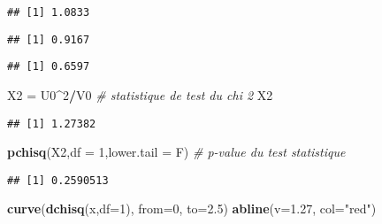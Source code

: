 \documentclass[
]{article}
\newenvironment{Shaded}{\begin{snugshade}}{\end{snugshade}}
\newcommand{\CommentTok}[1]{\textcolor[rgb]{0.56,0.35,0.01}{\textit{#1}}}
\newcommand{\DataTypeTok}[1]{\textcolor[rgb]{0.13,0.29,0.53}{#1}}
\newcommand{\DecValTok}[1]{\textcolor[rgb]{0.00,0.00,0.81}{#1}}
\newcommand{\FloatTok}[1]{\textcolor[rgb]{0.00,0.00,0.81}{#1}}
\newcommand{\KeywordTok}[1]{\textcolor[rgb]{0.13,0.29,0.53}{\textbf{#1}}}
\newcommand{\NormalTok}[1]{#1}
\newcommand{\OperatorTok}[1]{\textcolor[rgb]{0.81,0.36,0.00}{\textbf{#1}}}
\newcommand{\StringTok}[1]{\textcolor[rgb]{0.31,0.60,0.02}{#1}}
\begin{document}
\begin{verbatim}
## [1] 1.0833
\end{verbatim}

\begin{Shaded}
\end{Shaded}

\begin{verbatim}
## [1] 0.9167
\end{verbatim}

\begin{Shaded}
\end{Shaded}

\begin{verbatim}
## [1] 0.6597
\end{verbatim}

\begin{Shaded}
\begin{Highlighting}[]
\NormalTok{X2 =}\StringTok{ }\NormalTok{U0}\OperatorTok{^}\DecValTok{2}\OperatorTok{/}\NormalTok{V0 }\CommentTok{# statistique de test du chi 2}
\NormalTok{X2}
\end{Highlighting}
\end{Shaded}

\begin{verbatim}
## [1] 1.27382
\end{verbatim}

\begin{Shaded}
\begin{Highlighting}[]
\KeywordTok{pchisq}\NormalTok{(X2,}\DataTypeTok{df =} \DecValTok{1}\NormalTok{,}\DataTypeTok{lower.tail =}\NormalTok{ F) }\CommentTok{# p-value du test statistique}
\end{Highlighting}
\end{Shaded}

\begin{verbatim}
## [1] 0.2590513
\end{verbatim}

\begin{Shaded}
\begin{Highlighting}[]
\KeywordTok{curve}\NormalTok{(}\KeywordTok{dchisq}\NormalTok{(x,}\DataTypeTok{df=}\DecValTok{1}\NormalTok{), }\DataTypeTok{from=}\DecValTok{0}\NormalTok{, }\DataTypeTok{to=}\FloatTok{2.5}\NormalTok{)}
\KeywordTok{abline}\NormalTok{(}\DataTypeTok{v=}\FloatTok{1.27}\NormalTok{, }\DataTypeTok{col=}\StringTok{"red"}\NormalTok{)}
\end{Highlighting}
\end{Shaded}
\end{document}

